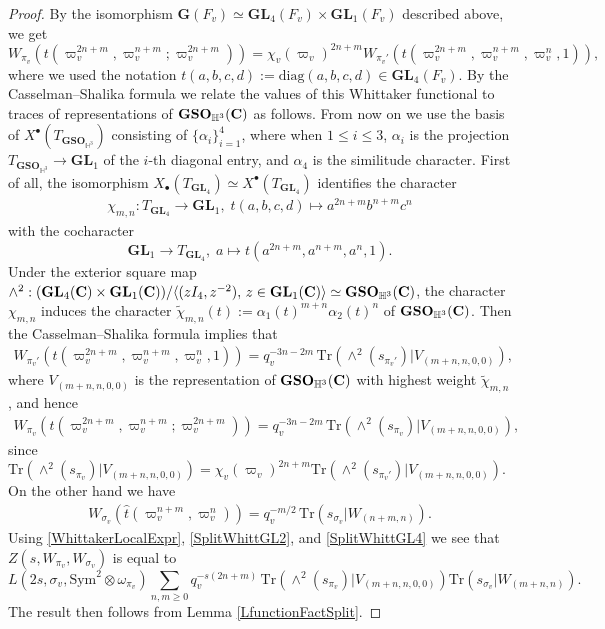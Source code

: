 \documentclass[11pt, reqno]{amsart}
\theoremstyle{plain}
\theoremstyle{definition}
\theoremstyle{remark}
\theoremstyle{plain}
\def\C{{\bf C}}
\def\G{\mathbf{G}}
\def\GSO{{\mathbf{GSO}}}
\def\GL{\mathbf{GL}}
\begin{document}
\begin{proof}

By the isomorphism $\G(F_v)\simeq \GL_4(F_v)\times \GL_1(F_v)$ described above, we get
\[W_{\pi_v}(t(\varpi_v^{2n+m},\varpi_v^{n+m};\varpi_v^{2n+m})) = \chi_v(\varpi_v)^{2n+m}W_{\pi_v'}(t(\varpi^{2n+m}_v,\varpi^{n+m}_v,\varpi^n_v,1)),\]
where we used the notation $t(a,b,c,d) := \mathrm{diag}(a,b,c,d)\in \GL_4(F_v)$. By the Casselman--Shalika formula we relate the values of this Whittaker functional to traces of representations of $\GSO_{\mathbb{H}^3}(\C)$ as follows. 
From now on we use the basis of $X^{\bullet}(T_{\GSO_{\mathbb{H}^3}})$ consisting of $\{\alpha_i\}_{i = 1}^4$, where when $1\leq i\leq 3$, $\alpha_i$ is the projection $T_{\GSO_{\mathbb{H}^3}} \to \GL_1$ of the $i$-th diagonal entry, and $\alpha_4$ is the similitude character. First of all, the isomorphism $X_{\bullet}(T_{\GL_4})\simeq X^{\bullet}(T_{\GL_4})$ identifies the character 
\begin{align*}\chi_{m,n}:T_{\GL_4}\to \GL_1,\; t(a,b,c,d)\mapsto a^{2n+m}b^{n+m}c^{n}\end{align*}
with the cocharacter \[\GL_1\to T_{\GL_4},\;a\mapsto t(a^{2n+m},a^{n+m},a^{n},1).\]
Under the exterior square map $\wedge^2:(\GL_4(\C) \times \GL_1(\C))/\langle (z I_4, z^{-2}),\, z \in \GL_1(\C) \rangle  \simeq \GSO_{\mathbb{H}^3}(\C)$, the character $\chi_{m,n}$ induces the character $\tilde{\chi}_{m,n}(t) := \alpha_1(t)^{m+n}\alpha_2(t)^{n}$ of $\GSO_{\mathbb{H}^3}(\C)$.
Then the Casselman--Shalika formula \cite{CasselmanShalikaII} implies that 
\begin{align*} W_{\pi_v'}(t(\varpi^{2n+m}_v,\varpi^{n+m}_v,\varpi^n_v,1)) = q_v^{-3n-2m}\, \mathrm{Tr}(\wedge^2(s_{\pi_v'})|V_{(m+n,n,0,0)}),\end{align*}
where $V_{(m+n,n,0,0)}$ is the representation of $\GSO_{\mathbb{H}^3}(\C)$ with highest weight $\tilde{\chi}_{m,n}$, and hence 
\begin{align}\label{SplitWhittGL4}W_{\pi_v}(t(\varpi_v^{2n+m},\varpi_v^{n+m};\varpi_v^{2n+m})) = q_v^{-3n-2m} \,\mathrm{Tr}(\wedge^2(s_{\pi_v})|V_{(m+n,n,0,0)}),\end{align}
since $\mathrm{Tr}(\wedge^2(s_{\pi_v})|V_{(m+n,n,0,0)}) = \chi_v(\varpi_v)^{2n+m} \mathrm{Tr}(\wedge^2(s_{\pi_v'})|V_{(m+n,n,0,0)})$.
On the other hand we have 
\begin{align}\label{SplitWhittGL2}
    W_{\sigma_v}(\hat{t}(\varpi_v^{n+m},\varpi_v^n)) = q_v^{-m/2}\, \mathrm{Tr}(s_{\sigma_v}|W_{(n+m,n)}).
\end{align} 
Using \eqref{WhittakerLocalExpr}, \eqref{SplitWhittGL2}, and \eqref{SplitWhittGL4} we see that $Z(s,W_{\pi_v},W_{\sigma_v})$ is equal to 
\begin{equation*}L(2s,\sigma_v,\mathrm{Sym}^2\otimes\omega_{\pi_v})   \sum_{n,m \geq 0} q_v^{-s(2n+m)}\, \mathrm{Tr}(\wedge^2(s_{\pi_v})|V_{(m+n,n,0,0)})\mathrm{Tr}(s_{\sigma_v}|W_{(m+n,n)}).\end{equation*}
The result then follows from Lemma \ref{LfunctionFactSplit}.
\end{proof}
\end{document}
